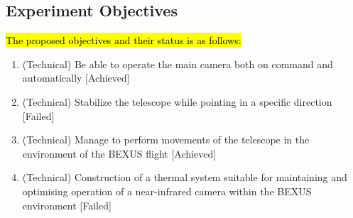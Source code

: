 \subsection{Experiment Objectives}


\hl{The proposed objectives and their status is as follows:}
\renewcommand{\labelenumi}{\Roman{enumi}}
\begin{enumerate}
    \item (Technical) Be able to operate the main camera both on command and automatically [Achieved]
    \item (Technical) Stabilize the telescope while pointing in a specific direction [Failed]
    \item (Technical) Manage to perform movements of the telescope in the environment of the BEXUS flight [Achieved]
    \item (Technical) Construction of a thermal system suitable for maintaining and optimising operation of a near-infrared camera within the BEXUS environment [Failed]
\end{enumerate}
